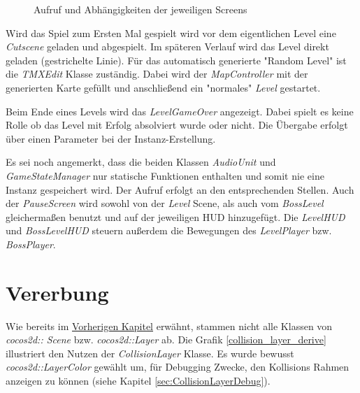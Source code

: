 \begin{figure}[h]
\scalebox{0.7}{}
\caption{Aufruf und Abhängigkeiten der jeweiligen Screens}
\label{calltree}
\end{figure}


Wird das Spiel zum Ersten Mal gespielt wird vor dem eigentlichen Level eine \textit{Cutscene} geladen und abgespielt. Im späteren Verlauf wird das Level direkt geladen (gestrichelte Linie).
Für das automatisch generierte "Random Level" ist die \textit{TMXEdit} Klasse zuständig. Dabei wird der \textit{MapController} mit der generierten Karte gefüllt und anschließend ein "normales" \textit{Level} gestartet.

Beim Ende eines Levels wird das \textit{LevelGameOver} angezeigt. Dabei spielt es keine Rolle ob das Level mit Erfolg absolviert wurde oder nicht. Die Übergabe erfolgt über einen Parameter bei der Instanz-Erstellung.

Es sei noch angemerkt, dass die beiden Klassen \textit{AudioUnit} und \textit{GameStateManager} nur statische Funktionen enthalten und somit nie eine Instanz gespeichert wird. Der Aufruf erfolgt an den entsprechenden Stellen.
Auch der \textit{PauseScreen} wird sowohl von der \textit{Level} Scene, als auch vom \textit{BossLevel} gleichermaßen benutzt und auf der jeweiligen HUD hinzugefügt. Die \textit{LevelHUD} und \textit{BossLevelHUD} steuern außerdem die Bewegungen des \textit{LevelPlayer} bzw. \textit{BossPlayer}.



\section{Vererbung}\label{sec:3_Vererbung}

Wie bereits im \href{sec:Klassenuebersicht}{Vorherigen Kapitel} erwähnt, stammen nicht alle Klassen von \textit{cocos2d:: Scene} bzw. \textit{cocos2d::Layer} ab. Die Grafik \ref{collision_layer_derive} illustriert den Nutzen der \textit{CollisionLayer} Klasse.
Es wurde bewusst \textit{cocos2d::LayerColor} gewählt um, für Debugging Zwecke, den Kollisions Rahmen anzeigen zu können (siehe Kapitel \ref{sec:CollisionLayerDebug}).

